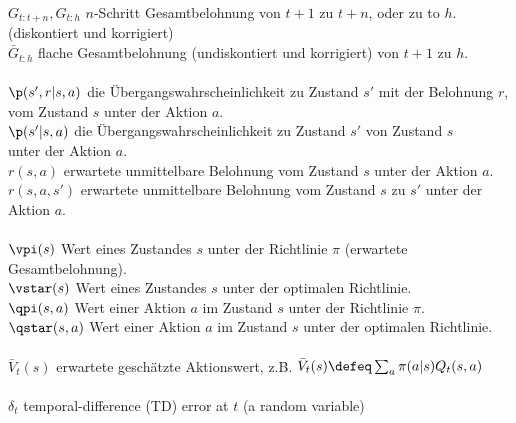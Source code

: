 \documentclass[a4paper,titlepage]{article}
\numberwithin{equation}{section} %
\begin{document}
\>$G_{t:t+n}, G_{t:h}$\> $n$-Schritt Gesamtbelohnung von $t+1$ zu $t+n$, oder zu to $h$. (diskontiert und korrigiert) \\
\>$\bar G_{t:h}$      \> flache Gesamtbelohnung (undiskontiert und korrigiert) von $t+1$ zu $h$.\\
\\
\>$\p(s',r|s,a)$      \> die Übergangswahrscheinlichkeit zu Zustand $s'$ mit der Belohnung $r$,\\ vom Zustand $s$ unter der Aktion $a$.\\
\>$\p(s'|s,a)$        \> die Übergangswahrscheinlichkeit zu Zustand $s'$ von Zustand $s$ \\unter der Aktion $a$.\\
\>$r(s,a)$            \> erwartete unmittelbare Belohnung vom Zustand $s$ unter der Aktion $a$.\\
\>$r(s,a,s')$         \> erwartete unmittelbare Belohnung vom Zustand $s$ zu $s'$ unter der Aktion $a$.\\
\\
\>$\vpi(s)$           \> Wert eines Zustandes $s$ unter der Richtlinie $\pi$ (erwartete Gesamtbelohnung).\\
\>$\vstar(s)$         \> Wert eines Zustandes $s$ unter der optimalen Richtlinie. \\
\>$\qpi(s,a)$         \> Wert einer Aktion $a$ im Zustand $s$ unter der Richtlinie $\pi$.\\
\>$\qstar(s,a)$       \> Wert einer Aktion $a$ im Zustand $s$ unter der optimalen Richtlinie. \\
\\
\>$\bar V_t(s)$       \> erwartete geschätzte Aktionswert, z.B. $\bar V_t(s)\defeq\sum_a\pi(a|s)Q_{t}(s,a)$\\
\\
\>$\delta_t$          \> temporal-difference (TD) error at $t$ (a random variable) \\
\end{document}
